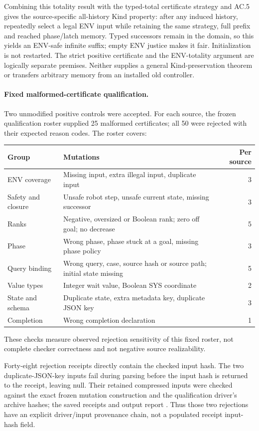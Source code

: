 Combining this totality result with the typed-total certificate strategy
and AC.5 gives the source-specific all-history Kind property: after any
induced history, repeatedly select a legal ENV input while retaining
the same strategy, full prefix and reached phase/latch memory. Typed
successors remain in the domain, so this yields an ENV-safe infinite
suffix; empty ENV justice makes it fair. Initialization is not restarted.
The strict positive certificate and the ENV-totality argument are
logically separate premises. Neither supplies a general Kind-preservation
theorem or transfers arbitrary memory from an installed old controller.

\paragraph{Fixed malformed-certificate qualification.}
Two unmodified positive controls were accepted. For each source, the
frozen qualification roster supplied 25 malformed certificates; all
50 were rejected with their expected reason codes. The roster covers:
\begin{center}\small
\begin{tabular}{@{}L{30mm}L{100mm}r@{}}\toprule
Group & Mutations & Per source\\\midrule
ENV coverage &
Missing input, extra illegal input, duplicate input & 3\\
Safety and closure &
Unsafe robot step, unsafe current state, missing successor & 3\\
Ranks &
Negative, oversized or Boolean rank; zero off goal; no decrease & 5\\
Phase &
Wrong phase, phase stuck at a goal, missing phase policy & 3\\
Query binding &
Wrong query, case, source hash or source path; initial state missing & 5\\
Value types &
Integer wait value, Boolean SYS coordinate & 2\\
State and schema &
Duplicate state, extra metadata key, duplicate JSON key & 3\\
Completion &
Wrong completion declaration & 1\\\bottomrule
\end{tabular}
\end{center}
These checks measure observed rejection sensitivity of this fixed
roster, not complete checker correctness and not negative source
realizability.

Forty-eight rejection receipts directly contain the checked input hash.
The two duplicate-JSON-key inputs fail during parsing before the input
hash is returned to the receipt, leaving 
null. Their retained compressed inputs were checked against the exact
frozen mutation construction and the qualification driver's archive
hashes; the saved receipts and output report
. Thus those two rejections have an explicit
driver/input provenance chain, not a populated receipt input-hash field.

